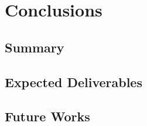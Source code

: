 \chapter{Conclusions}
\label{chapter_conclusion}

	 
	
\section{Summary}
\section{Expected Deliverables}

\section{Future Works}
	